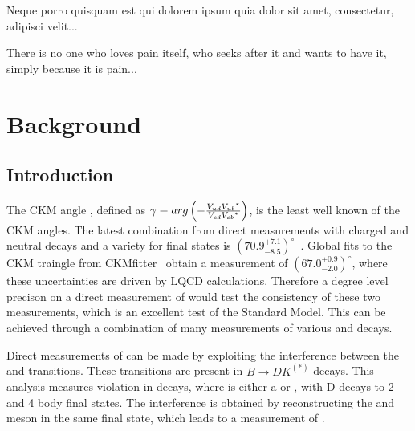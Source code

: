 \begin{savequote}[8cm]
\textlatin{Neque porro quisquam est qui dolorem ipsum quia dolor sit amet, consectetur, adipisci velit...}

There is no one who loves pain itself, who seeks after it and wants to have it, simply because it is pain...
\end{savequote}

\chapter{\label{ch:2-background}Background} 

\minitoc

\section{Introduction}
\label{sec:Introduction}

The CKM angle \Pgamma, defined as $\gamma \equiv arg\left(-\frac{{V_{{u}{d}}}{{V_{{u}{b}}}}^*}{{V_{{c}{d}}}{{V_{{c}{b}}}}^*}\right)$, is the least well known of the CKM angles. The latest \lhcb combination from direct measurements with charged and neutral \B decays and a variety for \D final states is $\left(70.9^{+7.1}_{-8.5}\right)^{\circ}$~\cite{LHCB-PAPER-2016-032-001}. Global fits to the CKM traingle from CKMfitter~\cite{CKMFitter2015} obtain a \Pgamma measurement of $(67.0^{+0.9}_{-2.0})^{\circ}$, where these uncertainties are driven by LQCD calculations. Therefore a degree level precison on a direct measurement of \Pgamma would test the consistency of these two measurements, which is an excellent test of the Standard Model. This can be achieved through a combination of many measurements of various \B and \D decays.

Direct measurements of \Pgamma can be made by exploiting the interference between the \decay{\bquark}{\cquark\uquarkbar\squark} and \decay{\bquark}{\uquark\cquarkbar\squark} transitions. These transitions are present in $B \to DK^{(*)}$ decays. This analysis measures \CP violation in \decay{\Bpm}{\D\Kstarpm} decays, where \D is either a \Dz or \Dzb, with D decays to 2 and 4 body final states. The interference is obtained by reconstructing the \Dz and \Dzb meson in the same final state, which leads to a measurement of \Pgamma.

